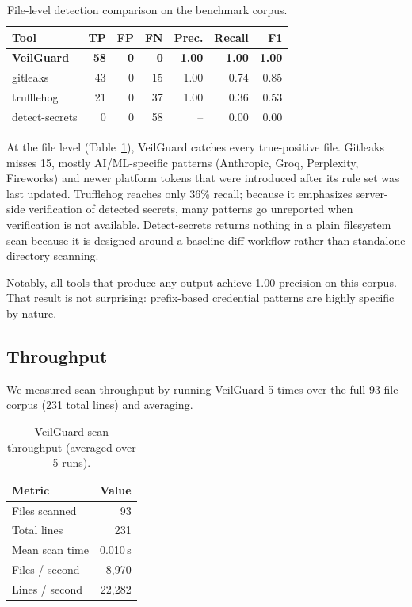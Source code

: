 \documentclass[conference]{IEEEtran}
\begin{document}
\begin{table}[ht]
\centering
\caption{File-level detection comparison on the benchmark corpus.}
\label{tab:tool-comparison}
\begin{tabular}{lrrrrrr}
\toprule
Tool & TP & FP & FN & Prec. & Recall & F1 \\
\midrule
\textbf{VeilGuard} & \textbf{58} & \textbf{0} & \textbf{0} & \textbf{1.00} & \textbf{1.00} & \textbf{1.00} \\
gitleaks       & 43 & 0 & 15 & 1.00 & 0.74 & 0.85 \\
trufflehog     & 21 & 0 & 37 & 1.00 & 0.36 & 0.53 \\
detect-secrets &  0 & 0 & 58 & --   & 0.00 & 0.00 \\
\bottomrule
\end{tabular}
\end{table}

At the file level (Table~\ref{tab:tool-comparison}), VeilGuard catches every
true-positive file. Gitleaks misses 15, mostly AI/ML-specific patterns
(Anthropic, Groq, Perplexity, Fireworks) and newer platform tokens that were
introduced after its rule set was last updated. Trufflehog reaches only 36\%
recall; because it emphasizes server-side verification of detected secrets, many
patterns go unreported when verification is not available. Detect-secrets
returns nothing in a plain filesystem scan because it is designed around a
baseline-diff workflow rather than standalone directory scanning.

Notably, all tools that produce any output achieve 1.00 precision on this
corpus. That result is not surprising: prefix-based credential patterns are
highly specific by nature.

\subsection{Throughput}
\label{sec:throughput}

We measured scan throughput by running VeilGuard 5 times over the full 93-file
corpus (231 total lines) and averaging.

\begin{table}[ht]
\centering
\caption{VeilGuard scan throughput (averaged over 5 runs).}
\label{tab:throughput}
\begin{tabular}{lr}
\toprule
Metric & Value \\
\midrule
Files scanned & 93 \\
Total lines & 231 \\
Mean scan time & 0.010\,s \\
Files / second & 8{,}970 \\
Lines / second & 22{,}282 \\
\bottomrule
\end{tabular}
\end{table}
\end{document}
